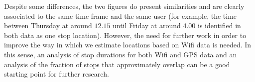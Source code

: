 Despite some differences, the two figures do present similarities and are
clearly associated to the same time frame and the same user (for example, the
time between Thursday at around $12.15$ until Friday at around $4.00$ is
identified in both data as one stop location). However, the need for further
work in order to improve the way in which we estimate locations based on Wifi
data is needed. In this sense, an analysis of stop durations for both Wifi
and GPS data and an analysis of the fraction of stops that approximately overlap
can be a good starting point for further research.
